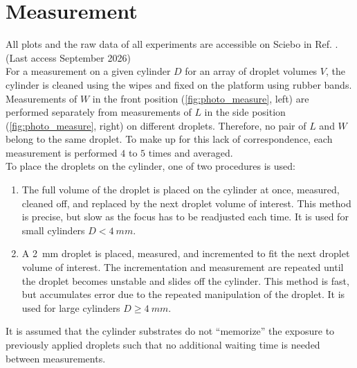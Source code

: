 


\section{Measurement}

    All plots and the raw data of all experiments are accessible on Sciebo in Ref. \cite{sciebo_data}. (Last access September 2026) \\

    For a measurement on a given cylinder $D$ for an array of droplet volumes $V$, the cylinder is cleaned using the wipes and fixed on the platform using rubber bands. Measurements of $W$ in the front position (\cref{fig:photo_measure}, left) are performed separately from measurements of $L$ in the side position (\cref{fig:photo_measure}, right) on different droplets. Therefore, no pair of $L$ and $W$ belong to the  same droplet. To make up for this lack of correspondence, each measurement is performed $4$ to $5$ times and averaged. \\

    To place the droplets on the cylinder, one of two procedures is used:
    \begin{enumerate}
        \item The full volume of the droplet is placed on the cylinder at once, measured, cleaned off, and replaced by the next droplet volume of interest. This method is precise, but slow as the focus has to be readjusted each time. It is used for small cylinders $D < \SI{4}{mm}$.
        \item A \SI{2}{mm} droplet is placed, measured, and incremented to fit the next droplet volume of interest. The incrementation and measurement are repeated until the droplet becomes unstable and slides off the cylinder. This method is fast, but accumulates error due to the repeated manipulation of the droplet. It is used for large cylinders $D \geq \SI{4}{mm}$.
    \end{enumerate}
    It is assumed that the cylinder substrates do not \enquote{memorize} the exposure to previously applied droplets such that no additional waiting time is needed between measurements. \\

